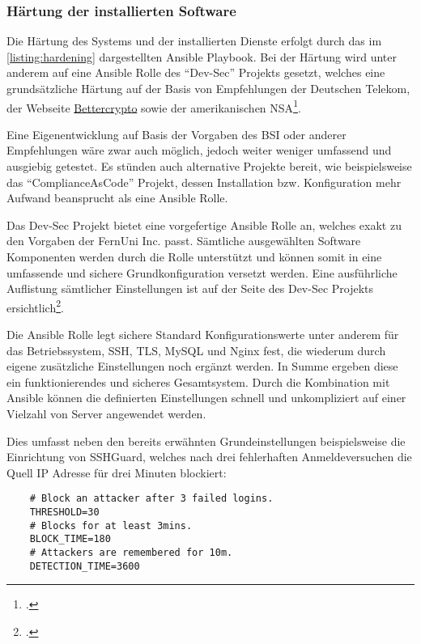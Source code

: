 \subsubsection{Härtung der installierten Software}

Die Härtung des Systems und der installierten Dienste erfolgt durch das im \autoref{listing:hardening} dargestellten Ansible Playbook. Bei der Härtung wird unter anderem auf eine Ansible Rolle des \enquote{Dev-Sec} Projekts gesetzt, welches eine grundsätzliche Härtung auf der Basis von Empfehlungen der Deutschen Telekom, der Webseite \href{https://bettercrypto.org/}{Bettercrypto} sowie der amerikanischen \ac{NSA}\footcite[Vgl.][]{OverviewDevSecBaselines}. 

Eine Eigenentwicklung auf Basis der Vorgaben des \ac{BSI} oder anderer Empfehlungen wäre zwar auch möglich, jedoch weiter weniger umfassend und ausgiebig getestet. Es stünden auch alternative Projekte bereit, wie beispielsweise das \enquote{ComplianceAsCode} Projekt, dessen Installation bzw. Konfiguration mehr Aufwand beansprucht als eine Ansible Rolle.

Das Dev-Sec Projekt bietet eine vorgefertige Ansible Rolle an, welches exakt zu den Vorgaben der FernUni Inc. passt. Sämtliche ausgewählten Software Komponenten werden durch die Rolle unterstützt und können somit in eine umfassende und sichere Grundkonfiguration versetzt werden. 
Eine ausführliche Auflistung sämtlicher Einstellungen ist auf der Seite des Dev-Sec Projekts ersichtlich\footcite[Vgl.][]{OverviewDevSecBaselines}.

Die Ansible Rolle legt sichere Standard Konfigurationswerte unter anderem für das Betriebssystem, \ac{SSH}, \ac{TLS}, MySQL und Nginx fest, die wiederum durch eigene zusätzliche Einstellungen noch ergänzt werden. In Summe ergeben diese ein funktionierendes und sicheres Gesamtsystem. Durch die Kombination mit Ansible können die definierten Einstellungen schnell und unkompliziert auf einer Vielzahl von Server angewendet werden.

Dies umfasst neben den bereits erwähnten Grundeinstellungen beispielsweise die Einrichtung von SSHGuard, welches nach drei fehlerhaften Anmeldeversuchen die Quell IP Adresse für drei Minuten blockiert:

\begin{verbatim}
	# Block an attacker after 3 failed logins.
	THRESHOLD=30
	# Blocks for at least 3mins.
	BLOCK_TIME=180
	# Attackers are remembered for 10m.
	DETECTION_TIME=3600
\end{verbatim}

